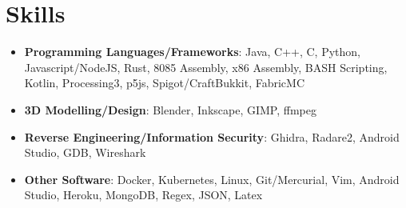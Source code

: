 \documentclass[letterpaper,11pt]{article}
\newcommand{\resumeSubHeadingListStart}{\begin{itemize}[leftmargin=*]}
\newcommand{\resumeSubHeadingListEnd}{\end{itemize}}
\begin{document}
\section{Skills}
 \resumeSubHeadingListStart
   \item{
     \textbf{Programming Languages/Frameworks}{: Java, C++, C, Python, Javascript/NodeJS, Rust, 8085 Assembly, x86 Assembly, BASH Scripting, Kotlin, Processing3, p5js, Spigot/CraftBukkit, FabricMC}
   }
    \item{
      \vspace{-8pt}
      \textbf{3D Modelling/Design}{: Blender, Inkscape, GIMP, ffmpeg}
    }
    \item{
      \vspace{-8pt}
      \textbf{Reverse Engineering/Information Security}{: Ghidra, Radare2, Android Studio, GDB, Wireshark}
    }
    \item{
      \vspace{-8pt}
      \textbf{Other Software}{: Docker, Kubernetes, Linux, Git/Mercurial, Vim, Android Studio, Heroku, MongoDB, Regex, JSON, Latex}
    }

 \resumeSubHeadingListEnd


\end{document}
